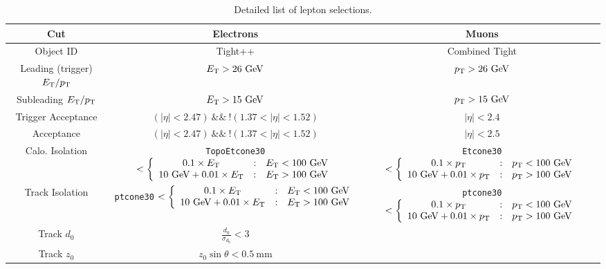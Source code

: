 \begin{table}[h]
	\footnotesize
		\begin{tabular}{ccc}
			Cut & Electrons & Muons \\
			\hline
			Object ID & Tight++ & Combined Tight \\
			Leading (trigger) $E_{\text{T}}/p_{\text{T}}$ & $E_{\text{T}}>26~\mbox{GeV}$ & $p_{\text{T}}>26~\mbox{GeV}$ \\
			Subleading $E_{\text{T}}/p_{\text{T}}$ & $E_{\text{T}}>15~\mbox{GeV}$ & $p_{\text{T}}>15~\mbox{GeV}$ \\
			Trigger Acceptance & $(|\eta|<2.47)\ \&\&\ !(1.37<|\eta|<1.52)$ & $|\eta|<2.4$ \\
			Acceptance & $(|\eta|<2.47)\ \&\&\ !(1.37<|\eta|<1.52)$ & $|\eta|<2.5$ \\
			Calo. Isolation & \verb.TopoEtcone30. $<\left\{\begin{array}{ccl} 0.1\times E_{\text{T}} & : & E_{\text{T}} < 100~\mbox{GeV} \\ 10~\mbox{GeV}+0.01\times E_{\text{T}} & : & E_{\text{T}}>100~\mbox{GeV} \end{array}\right.$ & \verb.Etcone30. $<\left\{\begin{array}{ccl} 0.1\times p_{\text{T}} & : & p_{\text{T}} < 100~\mbox{GeV} \\ 10~\mbox{GeV}+0.01\times p_{\text{T}} & : & p_{\text{T}}>100~\mbox{GeV} \end{array}\right.$ \\
			Track Isolation & \verb.ptcone30. $<\left\{\begin{array}{ccl} 0.1\times E_{\text{T}} & : & E_{\text{T}} < 100~\mbox{GeV} \\ 10~\mbox{GeV}+0.01\times E_{\text{T}} & : & E_{\text{T}}>100~\mbox{GeV} \end{array}\right.$ & \verb.ptcone30. $<\left\{\begin{array}{ccl} 0.1\times p_{\text{T}} & : & p_{\text{T}} < 100~\mbox{GeV} \\ 10~\mbox{GeV}+0.01\times p_{\text{T}} & : & p_{\text{T}}>100~\mbox{GeV} \end{array}\right.$ \\
			Track $d_0$ & $\frac{d_0}{\sigma_{d_0}}<3$  \\
			Track $z_0$ & $z_0\sin\theta<0.5~\mbox{mm}$  \\
		\end{tabular}
	\caption{Detailed list of lepton selections.}
	\label{table:lepton-selections}
\end{table}


